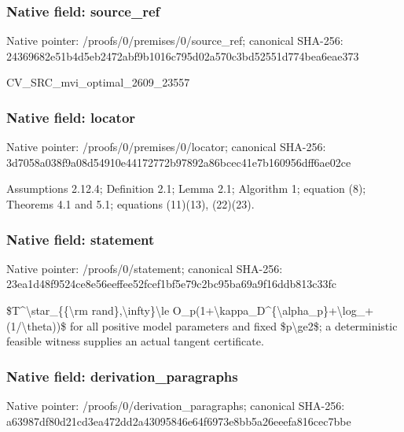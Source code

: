 \documentclass[10pt,a4paper]{article}
\begin{document}
\subsubsection{Native field: source\_ref}


Native pointer: /proofs/0/premises/0/source\_ref; canonical SHA-256: 24369682e51b4d5eb2472abf\allowbreak{}9b1016c795d02a570c3bd525\allowbreak{}51d774bea6eae373


CV\_SRC\_mvi\_optimal\_2609\_23557


\subsubsection{Native field: locator}


Native pointer: /proofs/0/premises/0/locator; canonical SHA-256: 3d7058a038f9a08d54910e44\allowbreak{}172772b97892a86bcec41e7b\allowbreak{}160956dff6ae02ce


Assumptions 2.12.4; Definition 2.1; Lemma 2.1; Algorithm 1; equation (8); Theorems 4.1 and 5.1; equations (11)(13), (22)(23).


\subsubsection{Native field: statement}


Native pointer: /proofs/0/statement; canonical SHA-256: 23ea1d48f9524ce8e56eeffe\allowbreak{}e52fcef1bf5e79c2bc95ba69\allowbreak{}a9f16ddb813c33fc


\$T\textasciicircum{}\textbackslash{}star\_\{\{\textbackslash{}rm rand\},\textbackslash{}infty\}\textbackslash{}le O\_p(1+\textbackslash{}kappa\_D\textasciicircum{}\{\textbackslash{}alpha\_p\allowbreak{}\}+\textbackslash{}log\_+(1/\textbackslash{}theta))\$ for all positive model parameters and fixed \$p\textbackslash{}ge2\$; a deterministic feasible witness supplies an actual tangent certificate.


\subsubsection{Native field: derivation\_paragraphs}


Native pointer: /proofs/0/derivation\_paragraphs; canonical SHA-256: a63987df80d21cd3ea472dd2\allowbreak{}a43095846e64f6973e8bb5a2\allowbreak{}6eeefa816cec7bbe
\end{document}
